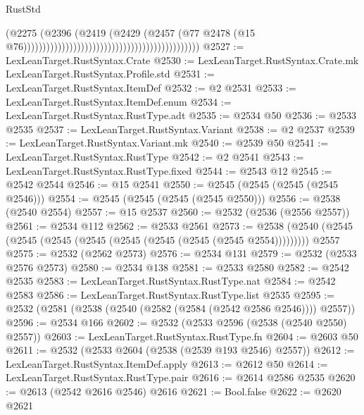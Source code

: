 \begin{lexlean}{RustStd}
\begin{coremodule}
                                                                                  (@2275
                                                                                    (@2396
                                                                                      (@2419
                                                                                        (@2429
                                                                                          (@2457
                                                                                            (@77
                                                                                              @2478
                                                                                              (@15
                                                                                                @76))))))))))))))))))))))))))))))))))))))))))))))
@2527 := LexLeanTarget.RustSyntax.Crate
@2530 := LexLeanTarget.RustSyntax.Crate.mk LexLeanTarget.RustSyntax.Profile.std
@2531 := LexLeanTarget.RustSyntax.ItemDef
@2532 := @2 @2531
@2533 := LexLeanTarget.RustSyntax.ItemDef.enum
@2534 := LexLeanTarget.RustSyntax.RustType.adt
@2535 := @2534 @50
@2536 := @2533 @2535
@2537 := LexLeanTarget.RustSyntax.Variant
@2538 := @2 @2537
@2539 := LexLeanTarget.RustSyntax.Variant.mk
@2540 := @2539 @50
@2541 := LexLeanTarget.RustSyntax.RustType
@2542 := @2 @2541
@2543 := LexLeanTarget.RustSyntax.RustType.fixed
@2544 := @2543 @12
@2545 := @2542 @2544
@2546 := @15 @2541
@2550 := @2545 (@2545 (@2545 (@2545 @2546)))
@2554 := @2545 (@2545 (@2545 (@2545 @2550)))
@2556 := @2538 (@2540 @2554)
@2557 := @15 @2537
@2560 := @2532 (@2536 (@2556 @2557))
@2561 := @2534 @112
@2562 := @2533 @2561
@2573 := @2538 (@2540 (@2545 (@2545 (@2545 (@2545 (@2545 (@2545 (@2545 (@2545 @2554))))))))) @2557
@2575 := @2532 (@2562 @2573)
@2576 := @2534 @131
@2579 := @2532 (@2533 @2576 @2573)
@2580 := @2534 @138
@2581 := @2533 @2580
@2582 := @2542 @2535
@2583 := LexLeanTarget.RustSyntax.RustType.nat
@2584 := @2542 @2583
@2586 := LexLeanTarget.RustSyntax.RustType.list @2535
@2595 := @2532 (@2581 (@2538 (@2540 (@2582 (@2584 (@2542 @2586 @2546)))) @2557))
@2596 := @2534 @166
@2602 := @2532 (@2533 @2596 (@2538 (@2540 @2550) @2557))
@2603 := LexLeanTarget.RustSyntax.RustType.fn
@2604 := @2603 @50
@2611 := @2532 (@2533 @2604 (@2538 (@2539 @193 @2546) @2557))
@2612 := LexLeanTarget.RustSyntax.ItemDef.apply
@2613 := @2612 @50
@2614 := LexLeanTarget.RustSyntax.RustType.pair
@2616 := @2614 @2586 @2535
@2620 := @2613 (@2542 @2616 @2546) @2616
@2621 := Bool.false
@2622 := @2620 @2621

\end{coremodule}
\end{lexlean}
